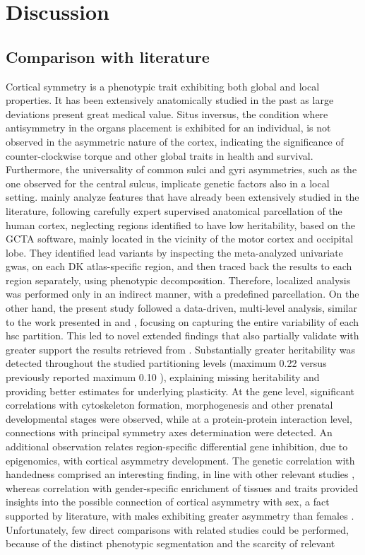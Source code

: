 \chapter{Discussion}\label{chap:discussion}

\section{Comparison with literature}
Cortical symmetry is a phenotypic trait exhibiting both global and local properties. It has been extensively anatomically studied in the past as large deviations present great medical value. Situs inversus, the condition where antisymmetry in the organs placement is exhibited for an individual, is not observed in the asymmetric nature of the cortex, indicating the significance of counter-clockwise torque and other global traits in health and survival. Furthermore, the universality of common sulci and gyri asymmetries, such as the one observed for the central sulcus, implicate genetic factors also in a local setting.  \citet{Sha2021} mainly analyze features that have already been extensively studied in the literature, following carefully expert supervised anatomical parcellation of the human cortex, neglecting regions identified to have low heritability, based on the GCTA software, mainly located in the vicinity of the motor cortex and occipital lobe. They identified lead variants by inspecting the meta-analyzed univariate \ac{gwas}, on each DK atlas-specific region, and then traced back the results to each region separately, using phenotypic decomposition\cite{Lin2020}. Therefore, localized analysis was performed only in an indirect manner, with a predefined parcellation. On the other hand, the present study followed a data-driven, multi-level analysis, similar to the work presented in \cite{Naqvi2021} and \cite{Claes2018}, focusing on capturing the entire variability of each  \ac{hsc} partition. This led to novel extended findings that also partially validate with greater support the results retrieved from \citet{Sha2021}. Substantially greater heritability was detected throughout the studied partitioning levels (maximum 0.22 versus previously reported maximum 0.10 \cite{Sha2021}), explaining missing heritability and providing better estimates for underlying plasticity. At the gene level, significant correlations with cytoskeleton formation, morphogenesis and other prenatal developmental stages were observed, while at a protein-protein interaction level, connections with principal symmetry axes determination were detected. An additional observation relates region-specific differential gene inhibition, due to epigenomics, with cortical asymmetry development. The genetic correlation with handedness comprised an interesting finding, in line with other relevant studies \citet{Kong2021}, whereas correlation with gender-specific enrichment of tissues and traits provided insights into the possible connection of cortical asymmetry with sex, a fact supported by literature, with males exhibiting greater asymmetry than females \cite{Guadalupe2015}. Unfortunately, few direct comparisons with related studies could be performed,  because of the distinct phenotypic segmentation and the scarcity of relevant 